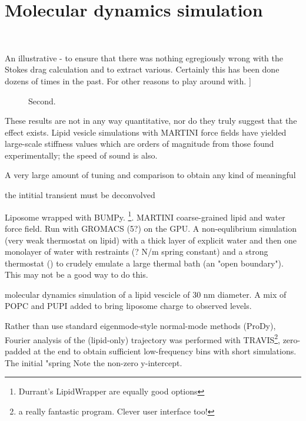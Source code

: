 \documentclass[paper.tex]{subfiles}
\begin{document}
\section{Molecular dynamics simulation}
\


An illustrative - to ensure that there was nothing egregiously wrong with the Stokes drag calculation and to extract various. Certainly this has been done dozens of times in the past. For other reasons to play around with. ]\

\begin{figure}[H]
	\centering
	\hfill
		\caption{Second.}
		
\end{figure}

These results are not in any way quantitative, nor do they truly suggest that the effect exists. Lipid vesicle simulations with MARTINI force fields have yielded large-scale stiffness values which are orders of magnitude\cite{Determining2014} from those found experimentally; the speed of sound is also. 

A very large amount of tuning and comparison  to obtain any kind of meaningful  

the intitial transient must be deconvolved

Liposome wrapped with BUMPy\cite{BUMPy2018}. \footnote{Durrant's LipidWrapper are equally good options}. MARTINI 
coarse-grained 
lipid and water force field. Run with GROMACS (5?) on the GPU. A non-equlibrium simulation (very weak thermostat on lipid) with a thick layer of explicit water and then one monolayer of water with restraints (? N/m spring constant) and a strong thermostat () to crudely emulate a large thermal bath (an "open boundary"). This may not be a good way to do this.

molecular dynamics simulation of a lipid vescicle of 30 nm diameter. A mix of POPC and PUPI added to bring liposome charge to 
observed levels.

Rather than use standard eigenmode-style normal-mode methods (ProDy), Fourier analysis of the (lipid-only) trajectory was performed with TRAVIS\footnote{a really fantastic program. Clever user interface too!}, zero-padded at the end to obtain sufficient low-frequency bins with short simulations. The initial "spring Note the non-zero y-intercept. 
\end{document}
